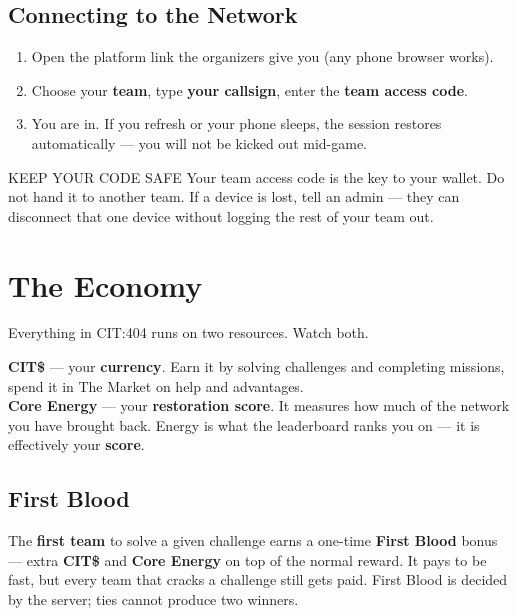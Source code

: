 \documentclass[11pt]{article}
\newcommand{\cit}{\textbf{\color{warn}CIT\$}}
\newcommand{\nrg}{\textbf{\color{info}Core Energy}}
\begin{document}
\subsection{Connecting to the Network}
\begin{enumerate}
  \item Open the platform link the organizers give you (any phone browser works).
  \item Choose your \textbf{team}, type \textbf{your callsign}, enter the
        \textbf{team access code}.
  \item You are in. If you refresh or your phone sleeps, the session restores
        automatically — you will not be kicked out mid-game.
\end{enumerate}

\begin{warnbox}{KEEP YOUR CODE SAFE}
Your team access code is the key to your wallet. Do not hand it to another
team. If a device is lost, tell an admin — they can disconnect that one device
without logging the rest of your team out.
\end{warnbox}

\clearpage
\section{The Economy}
Everything in CIT:404 runs on two resources. Watch both.

\begin{mypanel}
\textbf{\cit{}} — your \textbf{currency}. Earn it by solving challenges and
completing missions, spend it in The Market on help and advantages.
\\[6pt]
\textbf{\nrg{}} — your \textbf{restoration score}. It measures how much of the
network you have brought back. Energy is what the leaderboard ranks you on —
it is effectively your \textbf{score}.
\end{mypanel}

\subsection{First Blood}
The \textbf{first team} to solve a given challenge earns a one-time
\textbf{First Blood} bonus — extra \cit{} and \nrg{} on top of the normal
reward. It pays to be fast, but every team that cracks a challenge still gets
paid. First Blood is decided by the server; ties cannot produce two winners.
\end{document}
